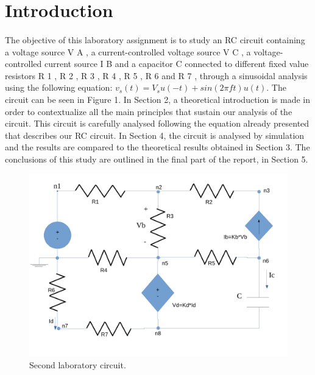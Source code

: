 \section{Introduction}
\label{sec:introduction}

\paragraph{} 
The objective of this laboratory assignment is to study an RC circuit containing a voltage source V A , a current-controlled voltage source V C , a voltage-controlled current source I B and a capacitor C connected to different fixed value resistors R 1 , R 2 , R 3 , R 4 , R 5 , R 6 and R 7 , through a sinusoidal analysis using the following equation: $v_s (t) = V_s u(−t) + sin(2 \pi ft)u(t) $. 
The circuit
can be seen in Figure 1.
In Section 2, a theoretical introduction is made in order to contextualize all the main principles that sustain our analysis of the circuit. This circuit is carefully analysed following the equation already presented that describes our RC circuit. In Section 4, the circuit is analysed by simulation and the results are compared to the theoretical results obtained in Section 3. The conclusions of this study are outlined in the final part of the report, in Section 5.

\begin{figure}[h] \centering
\includegraphics[width=0.4\linewidth]{circuit.pdf}
\caption{Second laboratory circuit.}
\label{fig:circuit}
\end{figure}

